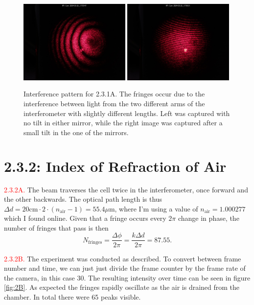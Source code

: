 \documentclass[letterpaper, reqno,11pt]{article}
\begin{document}
\begin{figure}[htpb]
    \centering
    \includegraphics[width=0.49\textwidth]{1A/media/im_0055_20240322_175547.jpg}
    \includegraphics[width=0.49\textwidth]{1A/media/im_0057_20240322_175601.jpg}
    \caption{Interference pattern for 2.3.1A. The fringes occur due to the interference between light from the two different arms of the interferometer with slightly different lengths. Left was captured with no tilt in either mirror, while the right image was captured after a small tilt in the one of the mirrors.}
    \label{fig:1A}
\end{figure}

\section{2.3.2: Index of Refraction of Air}

\noindent \textcolor{red}{2.3.2A.} The beam traverses the cell twice in the interferometer, once forward and the other backwards. The optical path length is thus $\Delta d=20\text{cm}\cdot 2\cdot (n_{\text{air}}-1)=55.4\mu$m, where I'm using a value of $n_{\text{air}}=1.000277$ which I found online. Given that a fringe occurs every $2\pi$ change in phase, the number of fringes that pass is then
\[
N_{\text{fringes}}=\frac{\Delta \phi}{2\pi}= \frac{k\Delta d}{2\pi}=87.55
.\]

\noindent \textcolor{red}{2.3.2B.} The experiment was conducted as described. To convert between frame number and time, we can just just divide the frame counter by the frame rate of the camera, in this case 30. The resulting intensity over time can be seen in figure \ref{fig:2B}. As expected the fringes rapidly oscillate as the air is drained from the chamber. In total there were 65 peaks visible.
\end{document}
